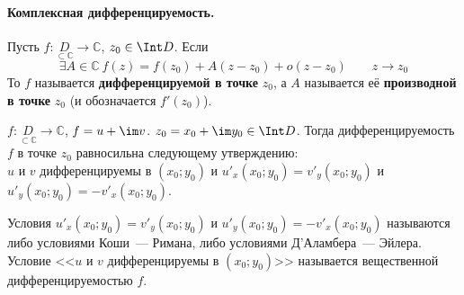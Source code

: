 \documentclass{article}
\begin{document}
    \paragraph{Комплексная дифференцируемость.}
    \begin{definition}
        Пусть $f\colon \underset{\subset\mathbb C}D\to\mathbb C$, $z_0\in\Int D$. Если
        $$\exists A\in\mathbb C~f(z)=f(z_0)+A(z-z_0)+o(z-z_0)\qquad z\to z_0$$
        То $f$ называется \textbf{дифференцируемой в точке} $z_0$, а $A$ называется её \textbf{производной в точке} $z_0$ (и обозначается $f'(z_0)$).
    \end{definition}
    \begin{theorem}
        \label{Условия комплексной дифференцируемости}
        $f\colon \underset{\subset\mathbb C}D\to\mathbb C$, $f=u+\im v$. $z_0=x_0+\im y_0\in\Int D$. Тогда дифференцируемость $f$ в точке $z_0$ равносильна следующему утверждению:\\
        $u$ и $v$ дифференцируемы в $(x_0;y_0)$ и $u'_x(x_0;y_0)=v'_y(x_0;y_0)$ и $u'_y(x_0;y_0)=-v'_x(x_0;y_0)$.
    \end{theorem}
    \begin{remark}
        Условия $u'_x(x_0;y_0)=v'_y(x_0;y_0)$ и $u'_y(x_0;y_0)=-v'_x(x_0;y_0)$ называются либо условиями Коши~--- Римана, либо условиями Д'Аламбера~--- Эйлера.\\
        Условие <<$u$ и $v$ дифференцируемы в $(x_0;y_0)$>> называется вещественной дифференцируемостью $f$.
    \end{remark}
\end{document}

